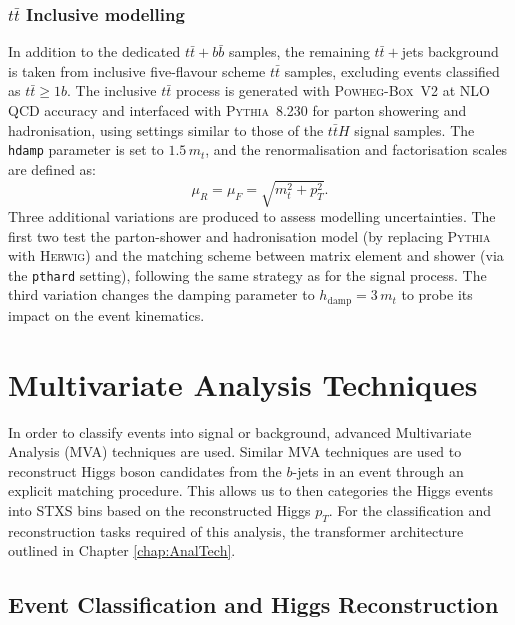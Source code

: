 \subsubsection{$t\bar{t}$ Inclusive modelling}
In addition to the dedicated $t\bar{t}+b\bar{b}$ samples, the remaining $t\bar{t}+$jets background is taken from inclusive five-flavour scheme $t\bar{t}$ samples, excluding events classified as $t\bar{t}\geq1b$. The inclusive $t\bar{t}$ process is generated with \textsc{Powheg-Box}~V2 at NLO QCD accuracy and interfaced with \textsc{Pythia}~8.230 for parton showering and hadronisation, using settings similar to those of the $t\bar{t}H$ signal samples. The \texttt{hdamp} parameter is set to $1.5\,m_{t}$, and the renormalisation and factorisation scales are defined as:
\begin{equation*}
    \mu_{R} = \mu_{F} = \sqrt{m_{t}^{2} + p_{T}^{2}}.
\end{equation*}
Three additional variations are produced to assess modelling uncertainties. The first two test the parton-shower and hadronisation model (by replacing \textsc{Pythia} with \textsc{Herwig}) and the matching scheme between matrix element and shower (via the \texttt{pthard} setting), following the same strategy as for the signal process. The third variation changes the damping parameter to $h_{\text{damp}}=3\,m_{t}$ to probe its impact on the event kinematics.



\section{Multivariate Analysis Techniques}
In order to classify events into signal or background, advanced Multivariate Analysis (MVA) techniques are used. Similar MVA techniques are used to reconstruct Higgs boson candidates from the $b$-jets in an event through an explicit matching procedure. This allows us to then categories the Higgs events into STXS bins based on the reconstructed Higgs $p_T$. For the classification and reconstruction tasks required of this analysis, the transformer architecture outlined in Chapter \ref{chap:AnalTech}.
\subsection{Event Classification and Higgs Reconstruction}
